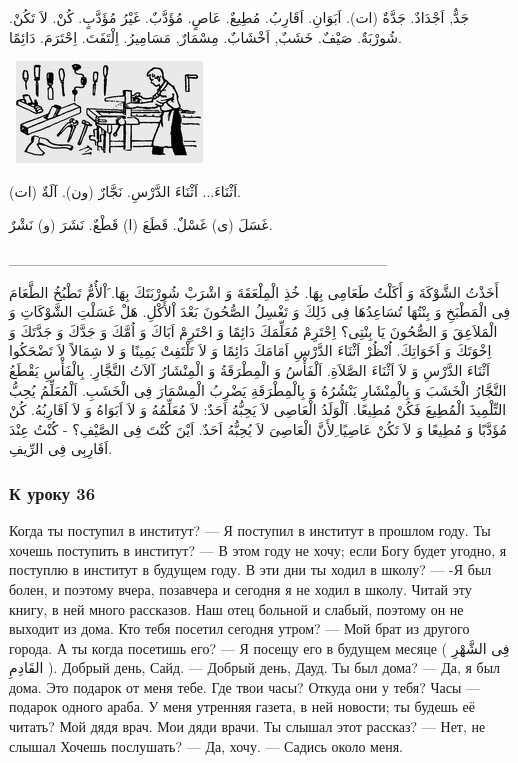 \documentclass[a5paper]{article}
\begin{document}
جَدٌّ, اَجْدَادٌ. جَدَّةٌ (ات). اَبَوَانِ. اَقَارِبُ. مُطِيعٌ. عَاصٍ. مُؤَدَّبٌ. غَيْرُ مُؤَدَّبٍ. كُنْ. لاَ تَكُنْ. شُورْبَةٌ. صَيْفٌ. خَشَبٌ, اَخْشَابٌ. مِسْمَارٌ, مَسَامِيرُ. اِلْتَفَتَ. اِحْتَرَمَ. دَائِمًا. 

\  \includegraphics[width=1.948in,height=1.0626in]{MuhammadBagauddinlatinized-img185.png} 

اَثْنَاءَ... اَثْنَاءَ الدَّرْسِ. نَجَّارٌ (ون). آلَةٌ (ات). 

غَسَلَ (ى) غَسْلٌ. قَطَعَ (ا) قَطْعٌ. نَشَرَ (و) نَشْرٌ.

\_\_\_\_\_\_\_\_\_\_\_\_\_\_\_\_\_\_\_\_\_\_\_\_\_\_\_\_\_\_\_\_\_\_\_\_

أَخَذْتُ الشَّوْكَةَ وَ أَكَلْتُ طَعَامِى بِهَا. خُذِ الْمِلْعَقَةَ وَ اشْرَبْ شُورْبَتَكَ بِهَا. َاْلأُمُّ تَطْبُخُ الطَّعَامَ فِى الْمَطْبَخِ وَ بِنْتُهَا تُسَاعِدُهَا فِى ذَلِكَ وَ تَغْسِلُ الصُّحُونَ بَعْدَ اْلأَكْلِ. هَلْ غَسَلْتِ الشَّوْكَاتِ وَ الْمَلاَعِقَ وَ الصُّحُونَ يَا بِنْتِى؟ اِحْتَرِمْ مُعَلِّمَكَ دَائِمًا وَ احْتَرِمْ اَبَاكَ وَ اُمَّكَ وَ جَدَّكَ وَ جَدَّتَكَ وَ اِخْوَتَكَ وَ اَخَوَاتِكَ. اُنْظُرْ اَثْنَاءَ الدَّرْسِ اَمَامَكَ دَائِمًا وَ لاَ تَلْتَفِتْ يَمِينًا وَ لا شِمَالاً لاَ تَضْحَكُوا اَثْنَاءَ الدَّرْسِ وَ لاَ اَثْنَاءَ الصَّلاَةِ. اَلْفَأْسُ وَ الْمِطْرَقَةُ وَ الْمِنْشَارُ آلاَتُ النَّجَّارِ. بِالْفَأْسِ يَقْطَعُ النَّجَّارُ الْخَشَبَ وَ بِالْمِنْشَارِ يَنْشُرُهُ وَ بِالْمِطْرَقَةِ يَضْرِبُ الْمِسْمَارَ فِى الْخَشَبِ. اَلْمُعَلِّمُ يُحِبُّ التِّلْمِيذَ الْمُطِيعَ فَكُنْ مُطِيعًا. اَلْوَلَدُ الْعَاصِى لاَ يَحِبُّهُ اَحَدٌ: لاَ مُعَلِّمُهُ وَ لاَ اَبَوَاهُ وَ لاَ اَقَارِبُهُ. كُنْ مُؤَدَّبًا وَ مُطِيعًا وَ لاَ تَكُنْ عَاصِيًا ِلأَنَّ الْعَاصِىَ لاَ يُحِبُّهُ اَحَدٌ. اَيْنَ كُنْتَ فِى الصَّيْفِ؟ - كُنْتُ عِنْدَ اَقَارِبِى فِى الرِّيفِ.

\subsubsection{К уроку 36}
Когда ты поступил в институт? — Я поступил в институт в прошлом году. Ты хочешь поступить в институт? — В этом году не хочу; если Богу будет угодно, я поступлю в институт в будущем году. В эти дни ты ходил в школу? — -Я был болен, и поэтому вчера, позавчера и сегодня я не ходил в школу. Читай эту книгу, в ней много рассказов. Наш отец больной и слабый, поэтому он не выходит из дома. Кто тебя посетил сегодня утром? — Мой брат из другого города. А ты когда посетишь его? — Я посещу его в будущем месяце ( فِى الشَّهْرِ القَادِمِ ). Добрый день, Сайд. — Добрый день, Дауд. Ты был дома? — Да, я был дома. Это подарок от меня тебе. Где твои часы? Откуда они у тебя? Часы — подарок одного араба. У меня утренняя газета, в ней новости; ты будешь её читать? Мой дядя врач. Мои дяди врачи. Ты слышал этот рассказ? — Нет, не слышал Хочешь послушать? — Да, хочу. — Садись около меня.
\end{document}

